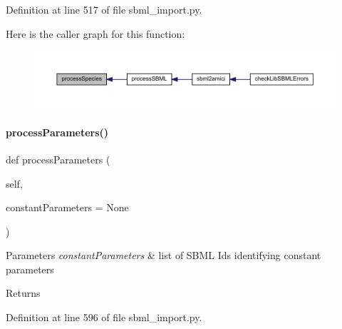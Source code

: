 Definition at line 517 of file sbml\+\_\+import.\+py.

Here is the caller graph for this function\+:
\nopagebreak
\begin{figure}[H]
\begin{center}
\leavevmode
\includegraphics[width=350pt]{classamici_1_1sbml__import_1_1_sbml_importer_a4912a89bf86ec8e0c1d9758b8090e327_icgraph}
\end{center}
\end{figure}
\mbox{\label{classamici_1_1sbml__import_1_1_sbml_importer_a26d072114efe1fec695cc4030c64e1ea}} 
\paragraph{\texorpdfstring{process\+Parameters()}{processParameters()}}
{\footnotesize\ttfamily def process\+Parameters (\begin{DoxyParamCaption}\item[{}]{self,  }\item[{}]{constant\+Parameters = {\ttfamily None} }\end{DoxyParamCaption})}


\begin{DoxyParams}{Parameters}
{\em constant\+Parameters} & list of S\+B\+ML Ids identifying constant parameters \\
\hline
\end{DoxyParams}
\begin{DoxyReturn}{Returns}

\end{DoxyReturn}


Definition at line 596 of file sbml\+\_\+import.\+py.

